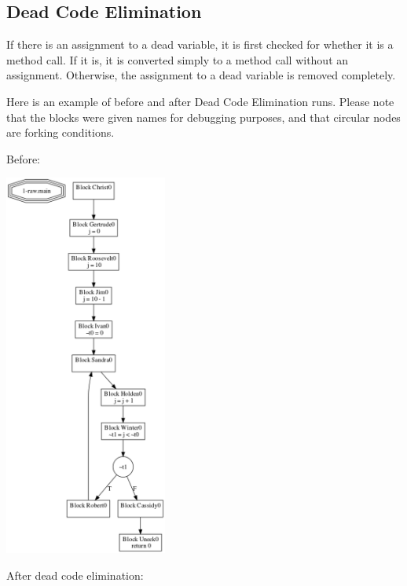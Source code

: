 \documentclass[11pt]{article}
\begin{document}
\subsection{Dead Code Elimination}
\label{sec-3-2}

  If there is an assignment to a dead variable, it is first checked for whether it is a method call. 
  If it is, it is converted simply to a method call without an assignment. Otherwise, the assignment
  to a dead variable is removed completely.

  Here is an example of before and after Dead Code Elimination runs. Please note that the blocks were
  given names for debugging purposes, and that circular nodes are forking conditions.

  Before: 

  \includegraphics[width=0.4\textwidth]{./before_deadcode_example.png}
  
  After dead code elimination:
\end{document}
